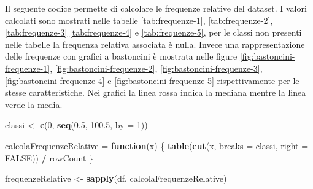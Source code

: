 \documentclass[]{book}
\newenvironment{Shaded}{\begin{snugshade}}{\end{snugshade}}
\newcommand{\KeywordTok}[1]{\textcolor[rgb]{0.13,0.29,0.53}{\textbf{#1}}}
\newcommand{\DataTypeTok}[1]{\textcolor[rgb]{0.13,0.29,0.53}{#1}}
\newcommand{\DecValTok}[1]{\textcolor[rgb]{0.00,0.00,0.81}{#1}}
\newcommand{\FloatTok}[1]{\textcolor[rgb]{0.00,0.00,0.81}{#1}}
\newcommand{\StringTok}[1]{\textcolor[rgb]{0.31,0.60,0.02}{#1}}
\newcommand{\OtherTok}[1]{\textcolor[rgb]{0.56,0.35,0.01}{#1}}
\newcommand{\ControlFlowTok}[1]{\textcolor[rgb]{0.13,0.29,0.53}{\textbf{#1}}}
\newcommand{\OperatorTok}[1]{\textcolor[rgb]{0.81,0.36,0.00}{\textbf{#1}}}
\newcommand{\NormalTok}[1]{#1}
\begin{document}
Il seguente codice permette di calcolare le frequenze relative del
dataset. I valori calcolati sono mostrati nelle tabelle
\ref{tab:frequenze-1}, \ref{tab:frequenze-2}, \ref{tab:frequenze-3}
\ref{tab:frequenze-4} e \ref{tab:frequenze-5}, per le classi non
presenti nelle tabelle la frequenza relativa associata è nulla. Invece
una rappresentazione delle frequenze con grafici a bastoncini è mostrata
nelle figure \ref{fig:bastoncini-frequenze-1},
\ref{fig:bastoncini-frequenze-2}, \ref{fig:bastoncini-frequenze-3},
\ref{fig:bastoncini-frequenze-4} e \ref{fig:bastoncini-frequenze-5}
rispettivamente per le stesse caratteristiche. Nei grafici la linea
rossa indica la mediana mentre la linea verde la media.

\begin{Shaded}
\begin{Highlighting}[]
\NormalTok{classi <-}\StringTok{ }\KeywordTok{c}\NormalTok{(}\DecValTok{0}\NormalTok{, }\KeywordTok{seq}\NormalTok{(}\FloatTok{0.5}\NormalTok{, }\FloatTok{100.5}\NormalTok{, }\DataTypeTok{by =} \DecValTok{1}\NormalTok{))}

\NormalTok{calcolaFrequenzeRelative =}\StringTok{ }\ControlFlowTok{function}\NormalTok{(x) \{}
  \KeywordTok{table}\NormalTok{(}\KeywordTok{cut}\NormalTok{(x, }\DataTypeTok{breaks =}\NormalTok{ classi, }\DataTypeTok{right =} \OtherTok{FALSE}\NormalTok{)) }\OperatorTok{/}\StringTok{ }\NormalTok{rowCount  }
\NormalTok{\}}

\NormalTok{frequenzeRelative <-}\StringTok{ }\KeywordTok{sapply}\NormalTok{(df, calcolaFrequenzeRelative)}
\end{Highlighting}
\end{Shaded}
\end{document}
